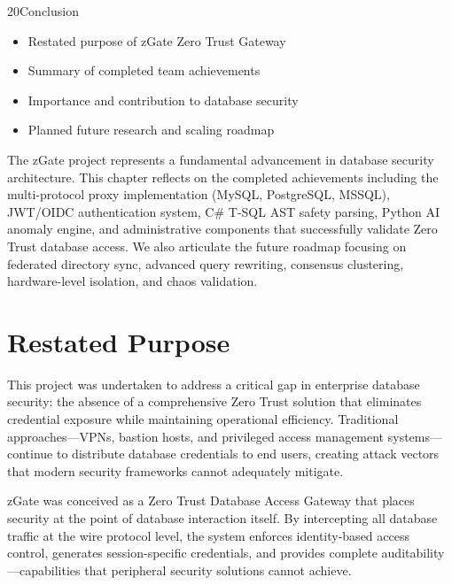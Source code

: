 
\begin{sectionintro}{20}{Conclusion}{
  \begin{itemize}[leftmargin=1.5em]
    \item Restated purpose of zGate Zero Trust Gateway
    \item Summary of completed team achievements
    \item Importance and contribution to database security
    \item Planned future research and scaling roadmap
  \end{itemize}
}
The zGate project represents a fundamental advancement in database security architecture. This chapter reflects on the completed achievements including the multi-protocol proxy implementation (MySQL, PostgreSQL, MSSQL), JWT/OIDC authentication system, C\# T-SQL AST safety parsing, Python AI anomaly engine, and administrative components that successfully validate Zero Trust database access. We also articulate the future roadmap focusing on federated directory sync, advanced query rewriting, consensus clustering, hardware-level isolation, and chaos validation.
\end{sectionintro}

\section{Restated Purpose}

This project was undertaken to address a critical gap in enterprise database security: the absence of a comprehensive Zero Trust solution that eliminates credential exposure while maintaining operational efficiency. Traditional approaches—VPNs, bastion hosts, and privileged access management systems—continue to distribute database credentials to end users, creating attack vectors that modern security frameworks cannot adequately mitigate.

zGate was conceived as a Zero Trust Database Access Gateway that places security at the point of database interaction itself. By intercepting all database traffic at the wire protocol level, the system enforces identity-based access control, generates session-specific credentials, and provides complete auditability—capabilities that peripheral security solutions cannot achieve.

